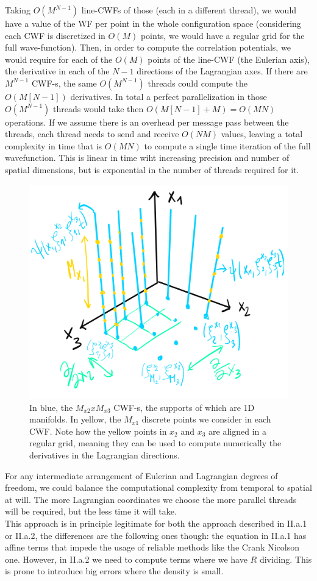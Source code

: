 \documentclass[11pt, a4paper]{article} %
\DeclareRobustCommand{\mybox}[2][gray!20]{%
\begin{tcolorbox}[   %
        left=1cm,
        right=1cm,
        top=0.5cm,
        bottom=0.5cm,
        colback=#1,
        colframe=#1,
        width=\dimexpr\textwidth\relax, 
        enlarge left by=0mm,
        boxsep=5pt,
        arc=0pt,outer arc=0pt,
        ]
        #2
\end{tcolorbox}
}
\begin{document}
\mybox{ Taking $O(M^{N-1})$ line-CWFs of those (each in a different thread), we would have a value of the WF per point in the whole configuration space (considering each CWF is discretized in $O(M)$ points, we would have a regular grid for the full wave-function). Then, in order to compute the correlation potentials, we would require for each of the $O(M)$ points of the line-CWF (the Eulerian axis), the derivative in each of the $N-1$ directions of the Lagrangian axes. If there are $M^{N-1}$ CWF-s, the same $O(M^{N-1})$ threads could compute the $O(M[N-1])$ derivatives. In total a perfect parallelization in those $O(M^{N-1})$ threads would take then $O(M[N-1]+M)=O(MN)$ operations. If we assume there is an overhead per message pass between the threads, each thread needs to send and receive $O(NM)$ values, leaving a total complexity in time that is $O(MN)$ to compute a single time iteration of the full wavefunction. This is linear in time wiht increasing precision and number of spatial dimensions, but is exponential in the number of threads required for it.}

\begin{figure}[h!]
  \centering
    \includegraphics[width=0.5\linewidth]{rectas.png}
  \caption{In blue, the $M_{x2}xM_{x3}$ CWF-s, the supports of which are 1D manifolds. In yellow, the $M_{x1}$ discrete points we consider in each CWF. Note how the yellow points in $x_2$ and $x_3$ are aligned in a regular grid, meaning they can be used to compute numerically the derivatives in the Lagrangian directions.  }
  \label{fig:lines}
\end{figure}

\mybox{
For any intermediate arrangement of Eulerian and Lagrangian degrees of freedom, we could balance the computational complexity from temporal to spatial at will. The more Lagrangian coordinates we choose the more parallel threads will be required, but the less time it will take.\\

This approach is in principle legitimate for both the approach described in II.a.1 or II.a.2, the differences are the following ones though: the equation in II.a.1 has affine terms that impede the usage of reliable methods like the Crank Nicolson one. However, in II.a.2 we need to compute terms where we have $R$ dividing. This is prone to introduce big errors where the density is small.

}
\end{document}
